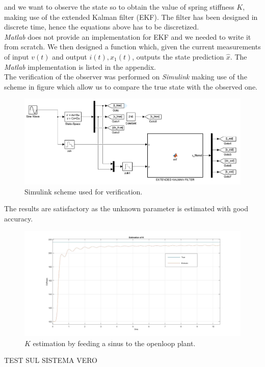 and we want to observe the state so to obtain the value of spring stiffness $K$, making use of the extended Kalman filter (EKF). The filter has been designed in discrete time, hence the equations above has to be discretized.\\

\emph{Matlab} does not provide an implementation for EKF and we needed to write it from scratch. We then designed a function which, given the current measurements of input $v(t)$ and output $i(t), x_1(t)$, outputs the state prediction $\hat{x}$. The \emph{Matlab} implementation is listed in the appendix.\\

The verification of the observer was performed on \emph{Simulink} making use of the scheme in figure which allow us to compare the true state with the observed one.

 
\begin{figure}[h]
\centering
\includegraphics[width=0.7\linewidth]{img/ekf_scheme}
\caption{Simulink scheme used for verification.}
\label{fig:ekfscheme}
\end{figure}

The results are satisfactory as the unknown parameter is estimated with good accuracy.\\

\begin{figure}[h]
\centering
\includegraphics[width=0.7\linewidth]{img/ekf_sin}
\caption{$K$ estimation by feeding a sinus to the openloop plant.}
\label{fig:ekfsin}
\end{figure}


TEST SUL SISTEMA VERO